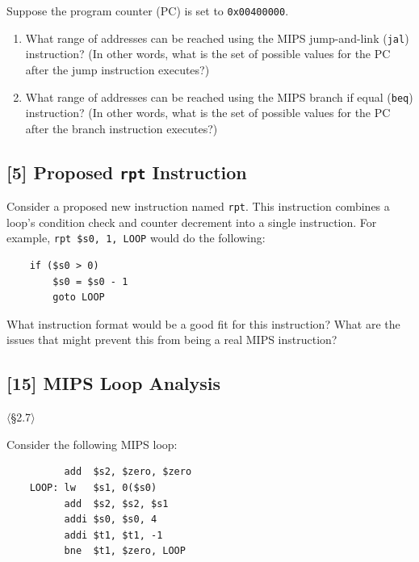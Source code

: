 \noindent Suppose the program counter (PC) is set to \texttt{0x00400000}.

\begin{enumerate}
  \item[2.22.1] [5] What range of addresses can be reached using the MIPS
        jump-and-link (\texttt{jal}) instruction? (In other words, what is
        the set of possible values for the PC after the jump instruction
        executes?)
  \item[2.22.2] [5] What range of addresses can be reached using the MIPS branch
        if equal (\texttt{beq}) instruction? (In other words, what is the set
        of possible values for the PC after the branch instruction executes?)
\end{enumerate}

\problembreak

\subsection{[5] Proposed \texttt{rpt} Instruction}
\hypertarget{prob-2.23}{}
\medskip

\noindent Consider a proposed new instruction named \texttt{rpt}. This
instruction combines a loop's condition check and counter decrement into a
single instruction. For example, \texttt{rpt \$s0, 1, LOOP} would do the
following:

\begin{verbatim}
    if ($s0 > 0)
        $s0 = $s0 - 1
        goto LOOP
\end{verbatim}

\noindent What instruction format would be a good fit for this instruction?
What are the issues that might prevent this from being a real MIPS instruction?

\problembreak

\subsection{[15] MIPS Loop Analysis}
\hypertarget{prob-2.24}{}
\noindent$\langle$\S2.7$\rangle$\medskip

\noindent Consider the following MIPS loop:
\begin{verbatim}
          add  $s2, $zero, $zero
    LOOP: lw   $s1, 0($s0)
          add  $s2, $s2, $s1
          addi $s0, $s0, 4
          addi $t1, $t1, -1
          bne  $t1, $zero, LOOP
\end{verbatim}

